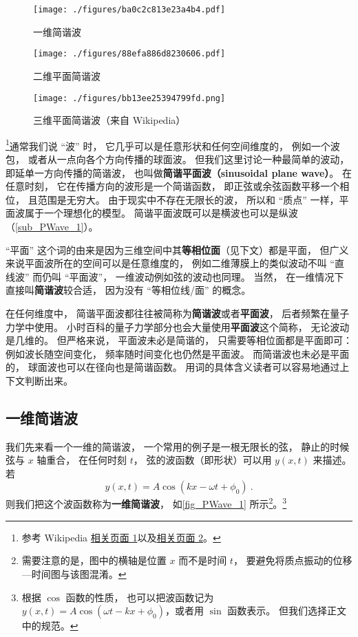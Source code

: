 

\begin{figure}[ht]
\centering
\texttt{[image: ./figures/ba0c2c813e23a4b4.pdf]}
\caption{一维简谐波} \label{fig_PWave_1}
\end{figure}

\begin{figure}[ht]
\centering
\texttt{[image: ./figures/88efa886d8230606.pdf]}
\caption{二维平面简谐波} \label{fig_PWave_2}
\end{figure}

\begin{figure}[ht]
\centering
\texttt{[image: ./figures/bb13ee25394799fd.png]}
\caption{三维平面简谐波（来自 Wikipedia）} \label{fig_PWave_3}
\end{figure}


\footnote{参考 Wikipedia \href{https://en.wikipedia.org/wiki/Plane_wave}{相关页面 1}以及\href{https://en.wikipedia.org/wiki/Sinusoidal_plane_wave}{相关页面 2}。}通常我们说 “波” 时， 它几乎可以是任意形状和任何空间维度的， 例如一个波包， 或者从一点向各个方向传播的球面波。 但我们这里讨论一种最简单的波动， 即延单一方向传播的简谐波， 也叫做\textbf{简谐平面波（sinusoidal plane wave）}。 在任意时刻， 它在传播方向的波形是一个简谐函数， 即正弦或余弦函数平移一个相位， 且范围是无穷大。 由于现实中不存在无限长的波， 所以和 “质点” 一样，平面波属于一个理想化的模型。 简谐平面波既可以是横波也可以是纵波（\autoref{sub_PWave_1}）。

“平面” 这个词的由来是因为三维空间中其\textbf{等相位面}（见下文）都是平面， 但广义来说平面波所在的空间可以是任意维度的， 例如二维薄膜上的类似波动不叫 “直线波” 而仍叫 “平面波”， 一维波动例如弦的波动也同理。 当然， 在一维情况下直接叫\textbf{简谐波}较合适， 因为没有 “等相位线/面” 的概念。

在任何维度中， 简谐平面波都往往被简称为\textbf{简谐波}或者\textbf{平面波}， 后者频繁在量子力学中使用。 小时百科的量子力学部分也会大量使用\textbf{平面波}这个简称， 无论波动是几维的。 但严格来说， 平面波未必是简谐的， 只需要等相位面都是平面即可： 例如波长随空间变化， 频率随时间变化也仍然是平面波。 而简谐波也未必是平面的， 球面波也可以在径向也是简谐函数。 用词的具体含义读者可以容易地通过上下文判断出来。

\subsection{一维简谐波}
我们先来看一个一维的简谐波， 一个常用的例子是一根无限长的弦， 静止的时候弦与 $x$ 轴重合， 在任何时刻 $t$， 弦的波函数（即形状）可以用 $y(x, t)$ 来描述。 若
\begin{equation}\label{eq_PWave_1}
y(x, t) = A\cos(k x - \omega t + \phi_0)~.
\end{equation}
则我们把这个波函数称为\textbf{一维简谐波}， 如\autoref{fig_PWave_1} 所示\footnote{需要注意的是，图中的横轴是位置 $x$ 而不是时间 $t$， 要避免将质点振动的位移—时间图与该图混淆。}。\footnote{根据 $\cos$ 函数的性质， 也可以把波函数记为 $y(x, t) = A\cos(\omega t - k x + \phi_0)$，或者用 $\sin$ 函数表示。 但我们选择正文中的规范。}

